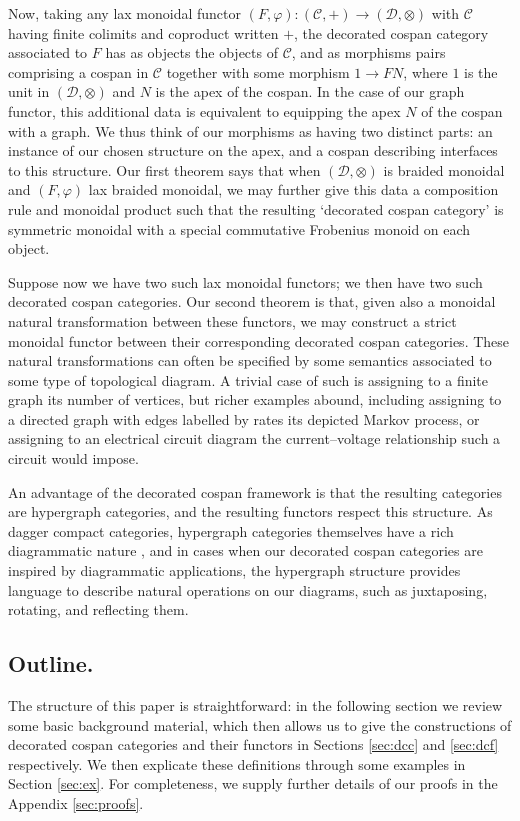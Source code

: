 Now, taking any lax monoidal functor $(F,\varphi)\colon  (\mathcal C,+) \to (\mathcal
D,\otimes)$ with $\mathcal C$ having finite colimits and coproduct written $+$,
the decorated cospan category associated to $F$ has as objects the objects of
$\mathcal C$, and as morphisms pairs comprising a cospan in $\mathcal C$
together with some morphism $1 \to FN$, where $1$ is the unit in $(\mathcal
D,\otimes)$ and $N$ is the apex of the cospan. In the case of our graph
functor, this additional data is equivalent to equipping the apex $N$ of the
cospan with a graph. We thus think of our morphisms as having two distinct
parts: an instance of our chosen structure on the apex, and a cospan describing
interfaces to this structure. Our first theorem says that when $(\mathcal
D,\otimes)$ is braided monoidal and $(F,\varphi)$ lax braided monoidal, we may
further give this data a composition rule and monoidal product such that the
resulting `decorated cospan category' is symmetric monoidal with a special
commutative Frobenius monoid on each object.  

Suppose now we have two such lax monoidal functors; we then have two such
decorated cospan categories. Our second theorem is that, given also a monoidal
natural transformation between these functors, we may construct a strict
monoidal functor between their corresponding decorated cospan categories.  These
natural transformations can often be specified by some semantics associated to
some type of topological diagram. A trivial case of such is assigning to a
finite graph its number of vertices, but richer examples abound, including
assigning to a directed graph with edges labelled by rates its depicted Markov
process, or assigning to an electrical circuit diagram the current--voltage
relationship such a circuit would impose.

An advantage of the decorated cospan framework is that the resulting categories
are hypergraph categories, and the resulting functors respect this structure.
As dagger compact categories, hypergraph categories themselves have a rich
diagrammatic nature \cite{Se}, and in cases when our decorated cospan categories
are inspired by diagrammatic applications, the hypergraph structure provides
language to describe natural operations on our diagrams, such as juxtaposing,
rotating, and reflecting them.

\subsection{Outline.}
The structure of this paper is straightforward: in the following section we
review some basic background material, which then allows us to give the
constructions of decorated cospan categories and their functors in Sections
\ref{sec:dcc} and \ref{sec:dcf} respectively. We then explicate these
definitions through some examples in Section \ref{sec:ex}. For completeness, we
supply further details of our proofs in the Appendix \ref{sec:proofs}.

